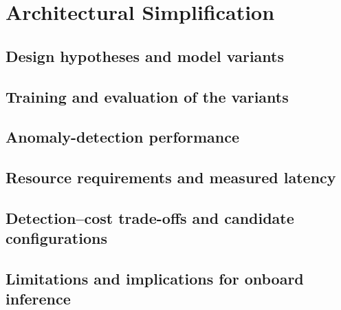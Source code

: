 \chapter{Architectural Simplification}
\label{chap:architecture}


\section{Design hypotheses and model variants}
\label{sec:architecture-variants}

\section{Training and evaluation of the variants}
\label{sec:architecture-protocol}

\section{Anomaly-detection performance}
\label{sec:architecture-detection}

\section{Resource requirements and measured latency}
\label{sec:architecture-resources}

\section{Detection--cost trade-offs and candidate configurations}
\label{sec:architecture-tradeoffs}

\section{Limitations and implications for onboard inference}
\label{sec:architecture-onboard}
